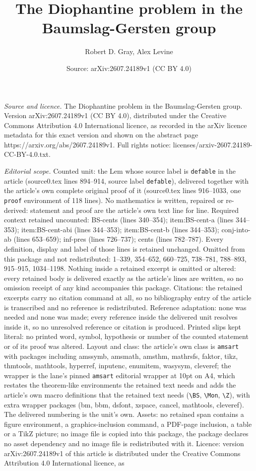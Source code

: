 \documentclass[10pt,a4paper]{amsart}
\title[The Diophantine problem in the Baumslag-Gersten group]{The Diophantine problem in the Baumslag-Gersten group}
\author{Robert D. Gray, Alex Levine}
\date{Source: arXiv:2607.24189v1 (CC BY 4.0)}
\begin{document}
\maketitle

\noindent\emph{Source and licence.} The Diophantine problem in the Baumslag-Gersten group. Version arXiv:2607.24189v1 (CC BY 4.0), distributed under the Creative Commons Attribution 4.0 International licence, as recorded in the arXiv licence metadata for this exact version and shown on the abstract page https://arxiv.org/abs/2607.24189v1. Full rights notice: licenses/arxiv-2607.24189-CC-BY-4.0.txt.\par\smallskip

\noindent\textit{Editorial scope.} Counted unit: the Lem whose source label is \texttt{defable} in the article (source0.tex lines 894--914, source label \texttt{defable}), delivered together with the article's own complete original proof of it (source0.tex lines 916--1033, one \texttt{proof} environment of 118 lines). No mathematics is written, repaired or re-derived: statement and proof are the article's own text line for line. Required context retained uncounted: BS-cents (lines 340--354); item:BS-cent-a (lines 344--353); item:BS-cent-abi (lines 344--353); item:BS-cent-b (lines 344--353); conj-into-ab (lines 653--659); inf-pres (lines 726--737); cents (lines 782--787). Every definition, display and label of those lines is retained unchanged. Omitted from this package and not redistributed: 1--339, 354--652, 660--725, 738--781, 788--893, 915--915, 1034--1198. Nothing inside a retained excerpt is omitted or altered: every retained body is delivered exactly as the article's lines are written, so no omission receipt of any kind accompanies this package. Citations: the retained excerpts carry no citation command at all, so no bibliography entry of the article is transcribed and no reference is redistributed. Reference adaptation: none was needed and none was made; every reference inside the delivered unit resolves inside it, so no unresolved reference or citation is produced. Printed slips kept literal: no printed word, symbol, hypothesis or number of the counted statement or of its proof was altered. Layout and class: the article's own class is \texttt{amsart} with packages including amssymb, amsmath, amsthm, mathrsfs, faktor, tikz, thmtools, mathtools, hyperref, inputenc, enumitem, wasysym, cleveref; the wrapper is the lane's pinned \texttt{amsart} editorial wrapper at 10pt on A4, which restates the theorem-like environments the retained text needs and adds the article's own macro definitions that the retained text needs (\texttt{\textbackslash BS}, \texttt{\textbackslash Mon}, \texttt{\textbackslash Z}), with extra wrapper packages (bm, bbm, dsfont, xspace, cancel, mathtools, cleveref). The delivered numbering is the unit's own. Assets: no retained span contains a figure environment, a graphics-inclusion command, a PDF-page inclusion, a table or a TikZ picture; no image file is copied into this package, the package declares no asset dependency and no image file is redistributed with it. Licence: version arXiv:2607.24189v1 of this article is distributed under the Creative Commons Attribution 4.0 International licence, as 
\end{document}
